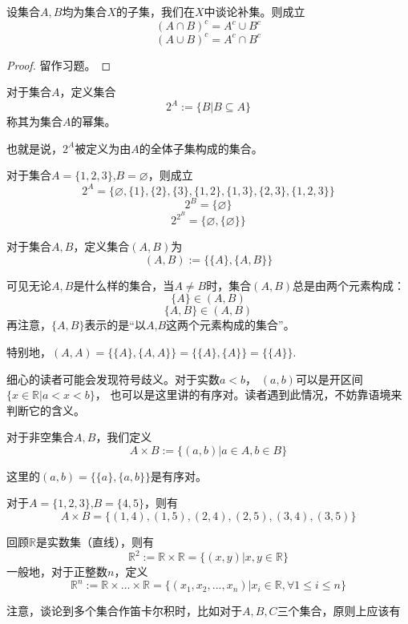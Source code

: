 \begin{prop}[摩根律]\label{set-morgen}
设集合$A,B$均为集合$X$的子集，我们在$X$中谈论补集。则成立
$$(A\cap B)^c=A^c\cup B^c$$
$$(A\cup B)^c=A^c\cap B^c$$
\end{prop}
\begin{proof}
留作习题。
\end{proof}

\begin{definition}[幂集]
对于集合$A$，定义集合
$$2^A:=\{B|B\subseteq A\}$$
称其为集合$A$的幂集。
\end{definition}
也就是说，$2^A$被定义为由$A$的全体子集构成的集合。

\begin{example}对于集合$A=\{1,2,3\}$,$B=\varnothing$，则成立
$$2^A=\{\varnothing,\{1\},\{2\},\{3\},
\{1,2\},\{1,3\},\{2,3\},\{1,2,3\}\}$$
$$2^B=\{\varnothing\}$$
$$2^{2^B}=\{\varnothing,\{\varnothing\}\}$$
\end{example}

\begin{definition}[有序对]
对于集合$A,B$，定义集合$(A,B)$为
$$(A,B):=\{\{A\},\{A,B\}\}$$
\end{definition}
可见无论$A,B$是什么样的集合，当$A\neq B$时，集合$(A,B)$总是由两个元素构成：
$$\{A\}\in(A,B)$$
$$\{A,B\}\in(A,B)$$
再注意，$\{A,B\}$表示的是“以$A$,$B$这两个元素构成的集合”。

特别地，$(A,A)=\{\{A\},\{A,A\}\}=\{\{A\},\{A\}\}=\{\{A\}\}$.

细心的读者可能会发现符号歧义。对于实数$a<b$，
$(a,b)$可以是开区间$\{x\in\mathbb{R}|a<x<b\}$，
也可以是这里讲的有序对。读者遇到此情况，不妨靠语境来判断它的含义。


\begin{definition}[笛卡尔积]
对于非空集合$A,B$，我们定义
$$A\times B:=\{(a,b)|a\in A, b\in B\}$$
\end{definition}
这里的$(a,b)=\{\{a\},\{a,b\}\}$是有序对。

\begin{example}对于$A=\{1,2,3\}$,$B=\{4,5\}$，则有
$$A\times B=\{(1,4),(1,5),(2,4),(2,5),(3,4),(3,5)\}$$
\end{example}

\begin{example}[$n$维空间]
回顾$\mathbb{R}$是实数集（直线），则有
$$\mathbb{R}^2:=\mathbb{R}\times\mathbb{R}
=\{(x,y)|x,y\in\mathbb{R}\}$$
一般地，对于正整数$n$，定义
$$\mathbb{R}^n:=\mathbb{R}\times...\times\mathbb{R}
=\{(x_1,x_2,...,x_n)|x_i\in\mathbb{R},\forall 1\leq i\leq n\}$$
\end{example}
注意，谈论到多个集合作笛卡尔积时，比如对于$A,B,C$三个集合，原则上应该有

